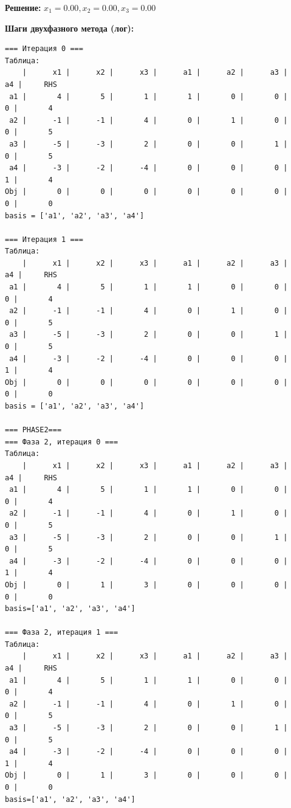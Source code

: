 \documentclass[a4paper,12pt]{article}
\begin{document}
\textbf{Решение: }$x_{1}=0.00, x_{2}=0.00, x_{3}=0.00$

\textbf{Шаги двухфазного метода (лог):}

\begin{verbatim}
=== Итерация 0 ===
Таблица:
    |      x1 |      x2 |      x3 |      a1 |      a2 |      a3 |      a4 |     RHS
 a1 |       4 |       5 |       1 |       1 |       0 |       0 |       0 |       4
 a2 |      -1 |      -1 |       4 |       0 |       1 |       0 |       0 |       5
 a3 |      -5 |      -3 |       2 |       0 |       0 |       1 |       0 |       5
 a4 |      -3 |      -2 |      -4 |       0 |       0 |       0 |       1 |       4
Obj |       0 |       0 |       0 |       0 |       0 |       0 |       0 |       0
basis = ['a1', 'a2', 'a3', 'a4']

=== Итерация 1 ===
Таблица:
    |      x1 |      x2 |      x3 |      a1 |      a2 |      a3 |      a4 |     RHS
 a1 |       4 |       5 |       1 |       1 |       0 |       0 |       0 |       4
 a2 |      -1 |      -1 |       4 |       0 |       1 |       0 |       0 |       5
 a3 |      -5 |      -3 |       2 |       0 |       0 |       1 |       0 |       5
 a4 |      -3 |      -2 |      -4 |       0 |       0 |       0 |       1 |       4
Obj |       0 |       0 |       0 |       0 |       0 |       0 |       0 |       0
basis = ['a1', 'a2', 'a3', 'a4']

=== PHASE2===
=== Фаза 2, итерация 0 ===
Таблица:
    |      x1 |      x2 |      x3 |      a1 |      a2 |      a3 |      a4 |     RHS
 a1 |       4 |       5 |       1 |       1 |       0 |       0 |       0 |       4
 a2 |      -1 |      -1 |       4 |       0 |       1 |       0 |       0 |       5
 a3 |      -5 |      -3 |       2 |       0 |       0 |       1 |       0 |       5
 a4 |      -3 |      -2 |      -4 |       0 |       0 |       0 |       1 |       4
Obj |       0 |       1 |       3 |       0 |       0 |       0 |       0 |       0
basis=['a1', 'a2', 'a3', 'a4']

=== Фаза 2, итерация 1 ===
Таблица:
    |      x1 |      x2 |      x3 |      a1 |      a2 |      a3 |      a4 |     RHS
 a1 |       4 |       5 |       1 |       1 |       0 |       0 |       0 |       4
 a2 |      -1 |      -1 |       4 |       0 |       1 |       0 |       0 |       5
 a3 |      -5 |      -3 |       2 |       0 |       0 |       1 |       0 |       5
 a4 |      -3 |      -2 |      -4 |       0 |       0 |       0 |       1 |       4
Obj |       0 |       1 |       3 |       0 |       0 |       0 |       0 |       0
basis=['a1', 'a2', 'a3', 'a4']

\end{verbatim}
\end{document}
